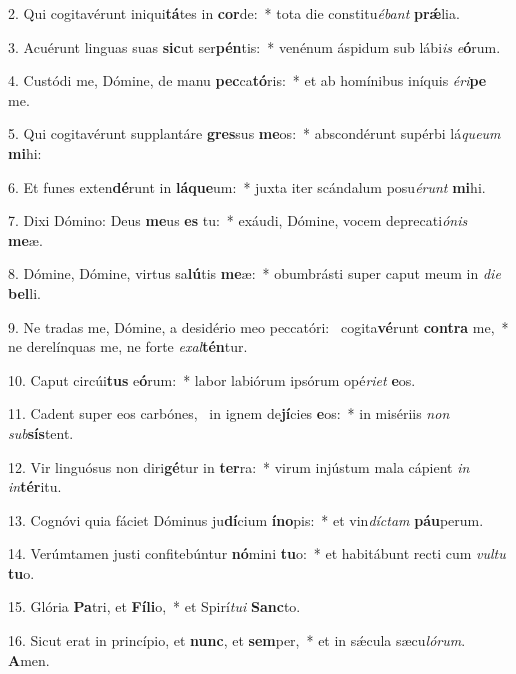 2. Qui cogitavérunt iniqui\textbf{tá}tes in \textbf{cor}de:~*  tota die constitu\textit{é}\textit{bant} \textbf{prǽ}lia.\

3. Acuérunt linguas suas \textbf{sic}ut ser\textbf{pén}tis:~*  venénum áspidum sub lábi\textit{is} \textit{e}\textbf{ó}rum.\

4. Custódi me, Dómine, de manu \textbf{pec}ca\textbf{tó}ris:~*  et ab homínibus iníquis \textit{é}\textit{ri}\textbf{pe} me.\

5. Qui cogitavérunt supplantáre \textbf{gres}sus \textbf{me}os:~*  abscondérunt supérbi lá\textit{que}\textit{um} \textbf{mi}hi:\

6. Et funes exten\textbf{dé}runt in \textbf{lá}\textbf{que}um:~*  juxta iter scándalum posu\textit{é}\textit{runt} \textbf{mi}hi.\

7. Dixi Dómino: Deus \textbf{me}us \textbf{es} tu:~*  exáudi, Dómine, vocem deprecati\textit{ó}\textit{nis} \textbf{me}æ.\

8. Dómine, Dómine, virtus sa\textbf{lú}tis \textbf{me}æ:~*  obumbrásti super caput meum in \textit{di}\textit{e} \textbf{bel}li.\

9. Ne tradas me, Dómine, a desidério meo peccatóri: \dag\  cogita\textbf{vé}runt \textbf{con}\textbf{tra} me,~*  ne derelínquas me, ne forte \textit{ex}\textit{al}\textbf{tén}tur.\

10. Caput circúi\textbf{tus} e\textbf{ó}rum:~*  labor labiórum ipsórum opé\textit{ri}\textit{et} \textbf{e}os.\

11. Cadent super eos carbónes, \dag\  in ignem de\textbf{jí}cies \textbf{e}os:~*  in misériis \textit{non} \textit{sub}\textbf{sís}tent.\

12. Vir linguósus non diri\textbf{gé}tur in \textbf{ter}ra:~*  virum injústum mala cápient \textit{in} \textit{in}\textbf{tér}itu.\

13. Cognóvi quia fáciet Dóminus ju\textbf{dí}cium \textbf{ín}\textbf{o}pis:~*  et vin\textit{díc}\textit{tam} \textbf{páu}perum.\

14. Verúmtamen justi confitebúntur \textbf{nó}mini \textbf{tu}o:~*  et habitábunt recti cum \textit{vul}\textit{tu} \textbf{tu}o.\

15. Glória \textbf{Pa}tri, et \textbf{Fí}\textbf{li}o,~*  et Spirí\textit{tu}\textit{i} \textbf{Sanc}to.\

16. Sicut erat in princípio, et \textbf{nunc}, et \textbf{sem}per,~*  et in sǽcula sæcu\textit{ló}\textit{rum}. \textbf{A}men.\

